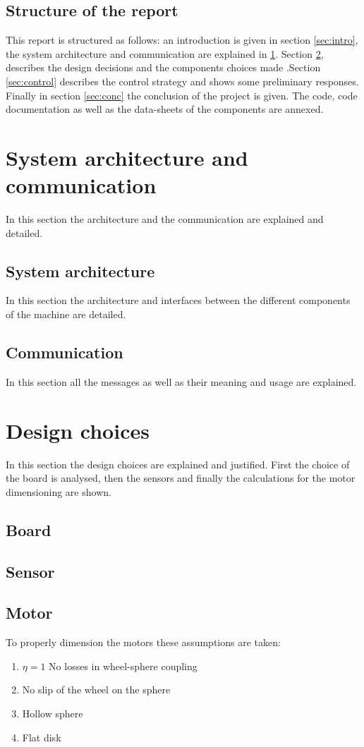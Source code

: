 \documentclass[12pt,a4paper]{article}
\begin{document}
\subsection{Structure of the report}
This report is structured as follows: an introduction is given in section \ref{sec:intro}, the system architecture and communication are explained in \ref{sec:archi}. Section \ref{sec:design}, describes the design decisions and the components choices made .Section \ref{sec:control} describes the control strategy and shows some preliminary responses.
Finally in section \ref{sec:conc} the conclusion of the project is given. The code, code documentation as well as the data-sheets of the components are annexed.

\section{System architecture and communication} \label{sec:archi}
In this section the architecture and the communication are explained and detailed.
\subsection{System architecture}
In this section the architecture and interfaces between the different components of the machine are detailed.
\subsection{Communication}
In this section all the messages as well as their meaning and usage are explained.

\section{Design choices}\label{sec:design}
In this section the design choices are explained and justified. First the choice of the board is analysed, then the sensors and finally the calculations for the motor dimensioning are shown.
\subsection{Board}
\subsection{Sensor}
\subsection{Motor}
To properly dimension the motors these assumptions are taken:
\begin{enumerate}
	\item $\eta = 1$ No losses in wheel-sphere coupling
	\item No slip of the wheel on the sphere
	\item Hollow sphere
	\item Flat disk
\end{enumerate}
\end{document}
